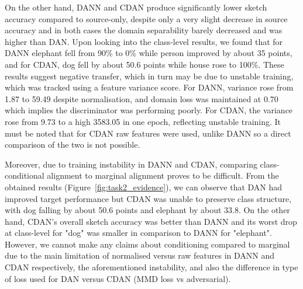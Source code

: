 \documentclass{article}
\begin{document}
On the other hand, DANN and CDAN produce significantly lower sketch accuracy compared to source-only, despite only a very slight decrease in source accuracy and in both cases the domain separability barely decreased and was higher than DAN. Upon looking into the class-level results, we found that for DANN elephant fell from 90\% to 0\% while person improved by about 35 points, and for CDAN, dog fell by about 50.6 points while house rose to 100\%. These results suggest negative transfer, which in turn may be due to unstable training, which was tracked using a feature variance score. For DANN, variance rose from 1.87 to 59.49 despite normalisation, and domain loss was maintained at 0.70 which implies the discriminator was performing poorly. For CDAN, the variance rose from 9.73 to a high 3583.05 in one epoch, reflecting unstable training. It must be noted that for CDAN raw features were used, unlike DANN so a direct comparison of the two is not possible. 

Moreover, due to training instability in DANN and CDAN, comparing class-conditional alignment to marginal alignment proves to be difficult. From the obtained results (Figure~\ref{fig:task2_evidence}), we can observe that DAN had improved target performance but CDAN was unable to preserve class structure, with dog falling by about 50.6 points and elephant by about 33.8. On the other hand, CDAN's overall sketch accuracy was better than DANN and its worst drop at class-level for "dog" was smaller in comparison to DANN for "elephant". However, we cannot make any claims about conditioning compared to marginal due to the main limitation of normalised versus raw features in DANN and CDAN respectively, the aforementioned instability, and also the difference in type of loss used for DAN versus CDAN (MMD loss vs adversarial).


\end{document}
